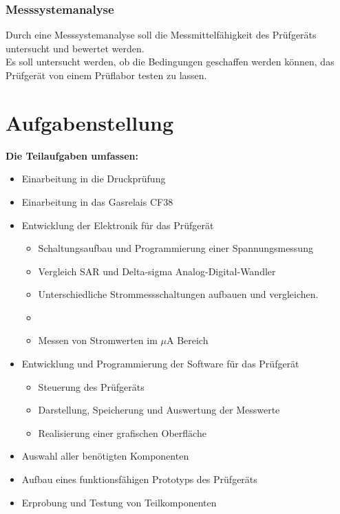 \subsubsection{Messsystemanalyse}
Durch eine Messsystemanalyse soll die Messmittelfähigkeit des Prüfgeräts untersucht und bewertet werden.
\\
Es soll untersucht werden, ob die Bedingungen geschaffen werden können, das Prüfgerät von einem Prüflabor
testen zu lassen.



\section{Aufgabenstellung}

\textbf{Die Teilaufgaben umfassen:}

\begin{itemize}
	\item Einarbeitung in die Druckprüfung
	\item Einarbeitung in das Gasrelais CF38
	\item Entwicklung der Elektronik für das Prüfgerät
	\begin{itemize}
		\item Schaltungsaufbau und Programmierung einer Spannungsmessung
		\item Vergleich SAR und Delta-sigma Analog-Digital-Wandler
		\item Unterschiedliche Strommessschaltungen aufbauen und vergleichen.
		\item 
		\item Messen von Stromwerten im \(\mu\)A Bereich
	\end{itemize}
	\item Entwicklung und Programmierung der Software für das Prüfgerät
	\begin{itemize}
		\item Steuerung des Prüfgeräts
		\item Darstellung, Speicherung und Auswertung der Messwerte
		\item Realisierung einer grafischen Oberfläche
	\end{itemize}
	\item Auswahl aller benötigten Komponenten
	\item Aufbau eines funktionsfähigen Prototyps des Prüfgeräts
	\item Erprobung und Testung von Teilkomponenten
\end{itemize}